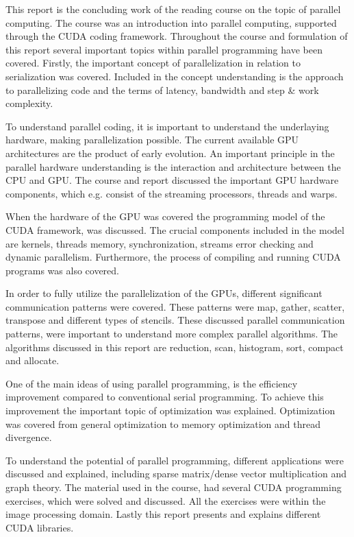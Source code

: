 This report is the concluding work of the reading course on the topic of parallel computing. 
The course was an introduction into parallel computing, supported through the CUDA coding framework. 
Throughout the course and formulation of this report several important topics within parallel programming have been covered. 
Firstly, the important concept of parallelization in relation to serialization was covered. 
Included in the concept understanding is the approach to parallelizing code and the terms of latency, bandwidth and step \& work complexity.

To understand parallel coding, it is important to understand the underlaying hardware, making parallelization possible. 
The current available GPU architectures are the product of early evolution. 
An important principle in the parallel hardware understanding is the interaction and architecture between the CPU and GPU. 
The course and report discussed the important GPU hardware components, which e.g. consist of the streaming processors, threads and warps. 

When the hardware of the GPU was covered the programming model of the CUDA framework, was discussed. The crucial components included in the model are kernels, threads memory, synchronization, streams error checking and dynamic parallelism. 
Furthermore, the process of compiling and running CUDA programs was also covered.

In order to fully utilize the parallelization of the GPUs, different significant communication patterns were covered. These patterns were map, gather, scatter, transpose and different types of stencils. These discussed parallel communication patterns, were important to understand more complex parallel algorithms. The algorithms discussed in this report are reduction, scan, histogram, sort, compact and allocate. 

One of the main ideas of using parallel programming, is the efficiency improvement compared to conventional serial programming. To achieve this improvement the important topic of optimization was explained. Optimization was covered from general optimization to memory optimization and thread divergence. 

To understand the potential of parallel programming, different applications were discussed and explained, including sparse matrix/dense vector multiplication and graph theory. The material used in the course, had several CUDA programming exercises, which were solved and discussed. All the exercises were within the image processing domain. Lastly this report presents and explains different CUDA libraries. 
